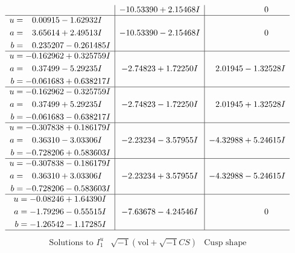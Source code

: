 \documentclass[1p]{elsarticle_modified}
\theoremstyle{definition}
\newcommand{\I}{\sqrt{-1}}
\begin{document}
$$\begin{array}{c|c|c}
 & -10.53390 + 2.15468 I & \phantom{-0.000000 } 0 \\ \hline\begin{aligned}
u &= \phantom{-}0.00915 - 1.62932 I \\
a &= \phantom{-}3.65614 + 2.49513 I \\
b &= \phantom{-}0.235207 - 0.261485 I\end{aligned}
 & -10.53390 - 2.15468 I & \phantom{-0.000000 } 0 \\ \hline\begin{aligned}
u &= -0.162962 + 0.325759 I \\
a &= \phantom{-}0.37499 - 5.29235 I \\
b &= -0.061683 + 0.638217 I\end{aligned}
 & -2.74823 + 1.72250 I & \phantom{-}2.01945 - 1.32528 I \\ \hline\begin{aligned}
u &= -0.162962 - 0.325759 I \\
a &= \phantom{-}0.37499 + 5.29235 I \\
b &= -0.061683 - 0.638217 I\end{aligned}
 & -2.74823 - 1.72250 I & \phantom{-}2.01945 + 1.32528 I \\ \hline\begin{aligned}
u &= -0.307838 + 0.186179 I \\
a &= \phantom{-}0.36310 - 3.03306 I \\
b &= -0.728206 + 0.583603 I\end{aligned}
 & -2.23234 - 3.57955 I & -4.32988 + 5.24615 I \\ \hline\begin{aligned}
u &= -0.307838 - 0.186179 I \\
a &= \phantom{-}0.36310 + 3.03306 I \\
b &= -0.728206 - 0.583603 I\end{aligned}
 & -2.23234 + 3.57955 I & -4.32988 - 5.24615 I \\ \hline\begin{aligned}
u &= -0.08246 + 1.64390 I \\
a &= -1.79296 - 0.55515 I \\
b &= -1.26542 - 1.17285 I\end{aligned}
 & -7.63678 - 4.24546 I & \phantom{-0.000000 } 0\\
 \hline 
 \end{array}$$\newpage$$\begin{array}{c|c|c}  
\text{Solutions to }I^u_{1}& \I (\text{vol} + \sqrt{-1}CS) & \text{Cusp shape}\\

\end{array}$$
\end{document}

